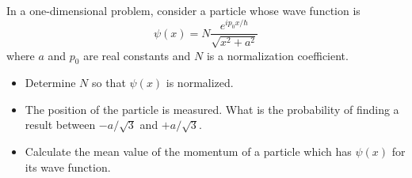 \documentclass[12pt,a4paper]{article}
\newenvironment{problem}[2][Problem]{\begin{trivlist}
\item[\hskip \labelsep {\bfseries #1}\hskip \labelsep {\bfseries #2.}]}{\end{trivlist}}
\begin{document}
\begin{problem}{1}
[C-T Exercise 3-1] In a one-dimensional problem, consider a particle whose wave function is
\[
\psi(x)=N\frac{e^{ip_0x/\hbar}}{\sqrt{x^2+a^2}}
\]
where $a$ and $p_0$ are real constants and $N$ is a normalization coefficient.
\begin{itemize}
\item[(a)] Determine $N$ so that $\psi(x)$ is normalized.
\item[(b)] The position of the particle is measured. What is the probability of finding a result between $-a/\sqrt{3}$ and $+a/\sqrt{3}$.
\item[(c)] Calculate the mean value of the momentum of a particle which has $\psi(x)$ for its wave function.
\end{itemize}
\end{problem}
\end{document}
